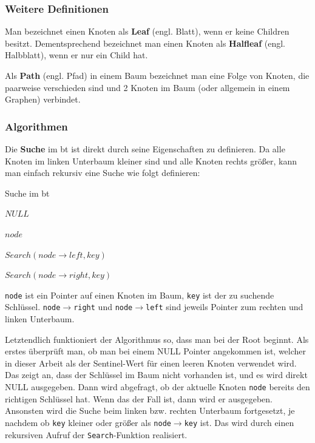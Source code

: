 \documentclass[11pt]{article}
\newcommand{\lstin}[1]{\lstinline[language=C]{#1}}
\begin{document}
\subsubsection{Weitere Definitionen}
Man bezeichnet einen Knoten als \textbf{Leaf} (engl. Blatt), wenn er keine Children besitzt. \cite[S. 36]{aic}
Dementsprechend bezeichnet man einen Knoten als \textbf{Halfleaf} (engl. Halbblatt), wenn er nur ein Child hat. 

Als \textbf{Path} (engl. Pfad) in einem Baum bezeichnet man eine Folge von Knoten, die paarweise verschieden sind und 2 Knoten im Baum (oder allgemein in einem Graphen) verbindet. \cite[S. 36]{aic}

\subsubsection{Algorithmen}

Die \textbf{Suche} im \gls{bt} ist direkt durch seine Eigenschaften zu definieren. 
Da alle Knoten im linken Unterbaum kleiner sind und alle Knoten rechts größer, kann man einfach rekursiv eine Suche wie folgt definieren:

\begin{algorithm}
  \caption{Suche im \gls{bt}}
  \begin{algorithmic}[1]
      
      \Return $NULL$
    \EndIf
      
      \Return $node$
      
      \Return $Search(node \rightarrow left, key)$
    \Else
      
      \Return $Search(node \rightarrow right, key)$
    \EndIf
  \EndProcedure
  \end{algorithmic}
\end{algorithm}

\lstin{node} ist ein Pointer auf einen Knoten im Baum, \lstin{key} ist der zu suchende Schlüssel.
\lstin{node}$\rightarrow$\lstin{right} und \lstin{node}$\rightarrow$\lstin{left} 
sind jeweils Pointer zum rechten und linken Unterbaum.

Letztendlich funktioniert der Algorithmus so, dass man bei der Root beginnt. 
Als erstes überprüft man, ob man bei einem NULL Pointer angekommen ist, welcher in dieser Arbeit als der Sentinel-Wert für einen leeren Knoten verwendet wird. 
Das zeigt an, dass der Schlüssel im Baum nicht vorhanden ist, und es wird direkt NULL ausgegeben.
Dann wird abgefragt, ob der aktuelle Knoten \lstin{node} bereits den richtigen Schlüssel hat. Wenn das der Fall ist, dann wird er ausgegeben.
Ansonsten wird die Suche beim linken bzw. rechten Unterbaum fortgesetzt, je nachdem ob \lstin{key} kleiner oder größer als \lstin{node}$\rightarrow$\lstin{key} ist.
Das wird durch einen rekursiven Aufruf der \lstin{Search}-Funktion realisiert. 
\cite[S. 203]{aic}
\end{document}
